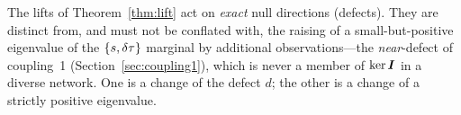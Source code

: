 \begin{remark}
\label{rem:distinct}
The lifts of Theorem~\ref{thm:lift} act on \emph{exact} null directions (defects). They are
distinct from, and must not be conflated with, the raising of a small-but-positive
eigenvalue of the $\{s,\delta\tau\}$ marginal by additional observations---the
\emph{near}-defect of coupling~1 (Section~\ref{sec:coupling1}), which is never a member of
$\ker\bm{I}$ in a diverse network. One is a change of the defect $d$; the other is a change
of a strictly positive eigenvalue.
\end{remark}
